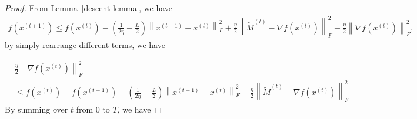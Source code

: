 \begin{proof}
From Lemma~\ref{descent lemma}, we have 
\begin{align*}
f(x^{(t+1)}) \leq f(x^{(t)}) - \left(\frac{1}{2\eta}-\frac{L}{2} \right)\left \| x^{(t+1)}-x^{(t)} \right \|_F^2 +\frac{\eta}{2}\left \| \tilde{M}^{(t)}-\nabla f(x^{(t)})  \right \|_F^2 - \frac{\eta}{2}\left \| \nabla f(x^{(t)}) \right \|_F^2, 
\end{align*}
by simply rearrange different terms, we have 

\begin{align*}
&\frac{\eta}{2}\left \| \nabla f(x^{(t)}) \right \|_F^2  \\
&\leq f(x^{(t)}) - f(x^{(t+1)}) - \left(\frac{1}{2\eta}-\frac{L}{2} \right)\left \| x^{(t+1)}-x^{(t)} \right \|_F^2 +\frac{\eta}{2}\left \| \tilde{M}^{(t)}-\nabla f(x^{(t)})  \right \|_F^2 
\end{align*}
By summing over $t$ from 0 to $T$, we have 


\end{proof}
